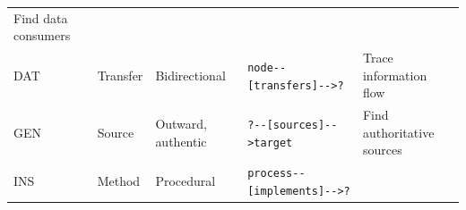 \documentclass[
  11pt,
  letterpaper,
]{article}
\begin{document}
\begin{longtable}[]{@{}lllll@{}}
\begin{minipage}[t]{0.25\columnwidth}
Find data consumers\strut
\end{minipage}\tabularnewline
\begin{minipage}[t]{0.07\columnwidth}\raggedright
DAT\strut
\end{minipage} & \begin{minipage}[t]{0.16\columnwidth}\raggedright
Transfer\strut
\end{minipage} & \begin{minipage}[t]{0.21\columnwidth}\raggedright
Bidirectional\strut
\end{minipage} & \begin{minipage}[t]{0.16\columnwidth}\raggedright
\texttt{node-\/-{[}transfers{]}-\/-\textgreater{}?}\strut
\end{minipage} & \begin{minipage}[t]{0.25\columnwidth}\raggedright
Trace information flow\strut
\end{minipage}\tabularnewline
\begin{minipage}[t]{0.07\columnwidth}\raggedright
GEN\strut
\end{minipage} & \begin{minipage}[t]{0.16\columnwidth}\raggedright
Source\strut
\end{minipage} & \begin{minipage}[t]{0.21\columnwidth}\raggedright
Outward, authentic\strut
\end{minipage} & \begin{minipage}[t]{0.16\columnwidth}\raggedright
\texttt{?-\/-{[}sources{]}-\/-\textgreater{}target}\strut
\end{minipage} & \begin{minipage}[t]{0.25\columnwidth}\raggedright
Find authoritative sources\strut
\end{minipage}\tabularnewline
\begin{minipage}[t]{0.07\columnwidth}\raggedright
INS\strut
\end{minipage} & \begin{minipage}[t]{0.16\columnwidth}\raggedright
Method\strut
\end{minipage} & \begin{minipage}[t]{0.21\columnwidth}\raggedright
Procedural\strut
\end{minipage} & \begin{minipage}[t]{0.16\columnwidth}\raggedright
\texttt{process-\/-{[}implements{]}-\/-\textgreater{}?}\strut
\end{minipage} & \begin{minipage}[t]{0.25\columnwidth}\raggedright

\end{minipage}
\end{longtable}
\end{document}
